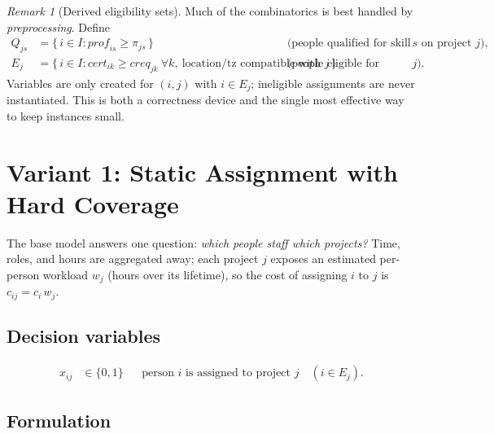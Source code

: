 \documentclass[11pt]{article}
\newcommand{\B}{\{0,1\}}
\theoremstyle{remark}
\newtheorem{remark}{Remark}[section]
\begin{document}
\begin{remark}[Derived eligibility sets]
\label{rem:eligibility}
Much of the combinatorics is best handled by \emph{preprocessing}. Define
\begin{align*}
Q_{js} &= \{\, i \in I : \mathit{prof}_{is} \ge \pi_{js} \,\}
  && \text{(people qualified for skill $s$ on project $j$),} \\
E_j &= \{\, i \in I : \mathit{cert}_{ik} \ge \mathit{creq}_{jk}\ \forall k,
      \ \text{location/tz compatible with } j \,\}
  && \text{(people eligible for project $j$).}
\end{align*}
Variables are only created for $(i,j)$ with $i \in E_j$; ineligible
assignments are never instantiated. This is both a correctness device and
the single most effective way to keep instances small.
\end{remark}

\section{Variant 1: Static Assignment with Hard Coverage}

The base model answers one question: \emph{which people staff which
projects?} Time, roles, and hours are aggregated away; each project $j$
exposes an estimated per-person workload $w_j$ (hours over its lifetime),
so the cost of assigning $i$ to $j$ is $c_{ij} = c_i \, w_j$.

\subsection{Decision variables}
\begin{align*}
x_{ij} &\in \B && \text{person $i$ is assigned to project $j$}
  \quad (i \in E_j).
\end{align*}

\subsection{Formulation}
\end{document}
